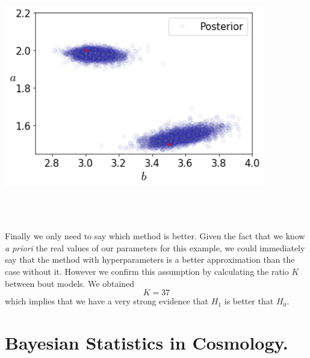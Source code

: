 \documentclass[onecolumn,           %
               showpacs,            %
               preprintnumbers,     %
               aps,                 %
               prl,          	    %
               letterpaper,             %
               superscriptaddress,      %
               nofootinbib,         %
               tightenlines,        %
               floats,floatfix      %
               ,usenatbib,
               ]{revtex4-1}
\begin{document}
\begin{minipage}{\textwidth}
\centering
\includegraphics[height=8cm]{Figures/contour_4.png}
\label{contour_4}
\end{minipage}\\ $ $

Finally we only need to say which method is better. Given the fact that we know \textit{a priori} the real values of our parameters for this example, we could immediately say that the method with hyperparameters is a better approximation than the case without it. However we confirm this assumption by calculating the ratio $K$ between bout models. We obtained
\begin{equation}
K = 37
\end{equation}
which implies that we have a very strong evidence that $H_1$ is better that $H_0$.

\section{Bayesian Statistics in Cosmology.}
\end{document}
